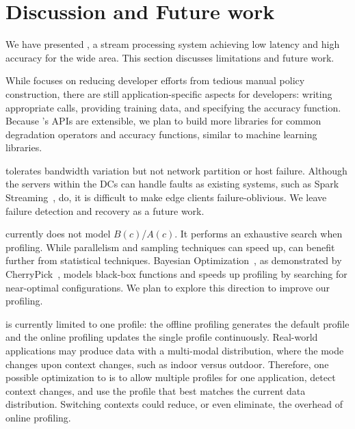 \section{Discussion and Future work}
\label{sec:discussion}

We have presented \sysname{}, a stream processing system achieving low latency
and high accuracy for the wide area. This section discusses limitations and
future work.

 While \sysname{} focuses on reducing
developer efforts from tedious manual policy construction, there are still
application-specific aspects for developers: writing appropriate \maybe{} calls,
providing training data, and specifying the accuracy function. Because
\sysname{}'s APIs are extensible, we plan to build more libraries for common
degradation operators and accuracy functions, similar to machine learning
libraries.

 \sysname{} tolerates bandwidth
variation but not network partition or host failure. Although the servers within
the DCs can handle faults as existing systems, such as Spark
Streaming~\cite{zaharia2013discretized}, do, it is difficult to make edge
clients failure-oblivious.  We leave failure detection and recovery as a future
work.

 \sysname{} currently does not model $B(c)$/$A(c)$. It
performs an exhaustive search when profiling. While parallelism and sampling
techniques can speed up, \sysname{} can benefit further from statistical
techniques. Bayesian Optimization~\cite{snoek2012practical}, as demonstrated by
CherryPick~\cite{alipourfard2017cherrypick}, models black-box functions and
speeds up profiling by searching for near-optimal configurations. We plan to
explore this direction to improve our profiling.


 \sysname{} is currently limited to one profile: the
offline profiling generates the default profile and the online profiling updates
the single profile continuously.  Real-world applications may produce data with
a multi-modal distribution, where the mode changes upon context changes, such as
indoor versus outdoor. Therefore, one possible optimization to \sysname{} is to
allow multiple profiles for one application, detect context changes, and use the
profile that best matches the current data distribution.  Switching contexts
could reduce, or even eliminate, the overhead of online profiling.

